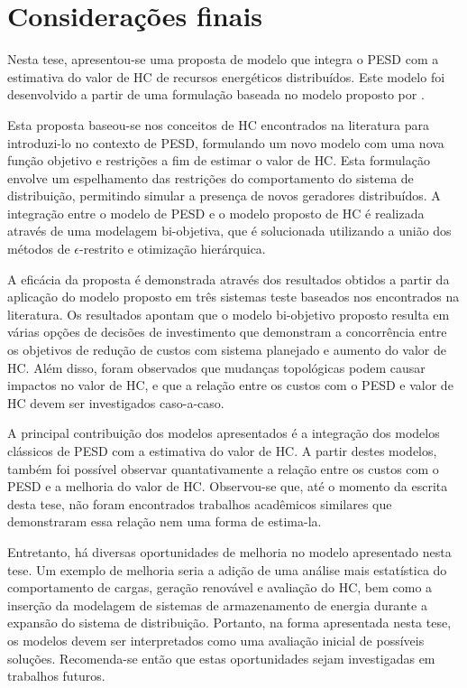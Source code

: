 \chapter{Considerações finais}
\label{consideraçao}

Nesta tese, apresentou-se uma proposta de modelo que integra o \ac{PESD} com a
estimativa do valor de \ac{HC} de recursos energéticos distribuídos. Este modelo
foi desenvolvido a partir de uma formulação baseada no modelo proposto por
.

Esta proposta baseou-se nos conceitos de \ac{HC} encontrados na literatura para
introduzi-lo no contexto de \ac{PESD}, formulando um novo modelo com uma nova
função objetivo e restrições a fim de estimar o valor de \ac{HC}. Esta
formulação envolve um espelhamento das restrições do comportamento do sistema de
distribuição, permitindo simular a presença de novos geradores distribuídos. A
integração entre o modelo de \ac{PESD} e o modelo proposto de \ac{HC} é
realizada através de uma modelagem bi-objetiva, que é solucionada utilizando a
união dos métodos de $\epsilon$-restrito e otimização hierárquica.

A eficácia da proposta é demonstrada através dos resultados obtidos a partir da
aplicação do modelo proposto em três sistemas teste baseados nos encontrados na
literatura. Os resultados apontam que o modelo bi-objetivo proposto resulta em
várias opções de decisões de investimento que demonstram a concorrência entre os
objetivos de redução de custos com sistema planejado e aumento do valor de
\ac{HC}. Além disso, foram observados que mudanças topológicas podem causar
impactos no valor de \ac{HC}, e que a relação entre os custos com o \ac{PESD} e
valor de \ac{HC} devem ser investigados caso-a-caso.

A principal contribuição dos modelos apresentados é a integração dos modelos
clássicos de \ac{PESD} com a estimativa do valor de \ac{HC}. A partir destes
modelos, também foi possível observar quantativamente a relação entre os custos
com o \ac{PESD} e a melhoria do valor de \ac{HC}. Observou-se que, até o momento
da escrita desta tese, não foram encontrados trabalhos acadêmicos similares que
demonstraram essa relação nem uma forma de estima-la.

Entretanto, há diversas oportunidades de melhoria no modelo apresentado nesta
tese. Um exemplo de melhoria seria a adição de uma análise mais estatística do
comportamento de cargas, geração renovável e avaliação do \ac{HC}, bem como a
inserção da modelagem de sistemas de armazenamento de energia durante a expansão
do sistema de distribuição. Portanto, na forma apresentada nesta tese, os
modelos devem ser interpretados como uma avaliação inicial de possíveis
soluções. Recomenda-se então que estas oportunidades sejam investigadas em
trabalhos futuros.

